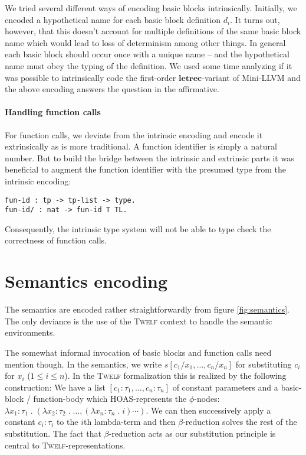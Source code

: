 \documentclass[a4paper, oneside, 10pt, draft]{memoir}
\newcommand{\twelf}{\textsc{Twelf}}
\begin{document}
We tried several different ways of encoding basic blocks
intrinsically. Initially, we encoded a hypothetical name for
each basic block definition $d_i$. It turns out, however, that this
doesn't account for multiple definitions of the same basic block
name which would lead to loss of determinism among other
things. In general each basic block should occur once with a unique
name -- and the hypothetical name must obey the typing of the
definition. We used some time analyzing if it was possible to
intrinsically code the first-order $\mathbf{letrec}$-variant of
Mini-LLVM and the above encoding answers the question in the
affirmative.

\paragraph{Handling function calls}

For function calls, we deviate from the intrinsic encoding and encode
it extrinsically as is more traditional. A function identifier is
simply a natural number. But to build the bridge between the intrinsic
and extrinsic parts it was beneficial to augment the function
identifier with the presumed type from the intrinsic encoding:
\begin{verbatim}
fun-id : tp -> tp-list -> type.
fun-id/ : nat -> fun-id T TL.
\end{verbatim}
Consequently, the intrinsic type system will not be able to type check
the correctness of function calls.

\section{Semantics encoding}

The semantics are encoded rather straightforwardly from figure
\ref{fig:semantics}. The only deviance is the use of the \twelf{}
context to handle the semantic environments.

The somewhat informal invocation of basic blocks and function calls
need mention though. In the semantics, we write $s[c_1/x_1, \dotsc,
c_n/x_n]$ for substituting $c_i$ for $x_i$ ($1 \leq i \leq n$). In the
\twelf{} formalization this is realized by the following construction:
We have a list $[c_1 : \tau_1, \dotsc, c_n : \tau_n]$ of constant
parameters and a basic-block / function-body which HOAS-represents the
$\phi$-nodes: $\lambda x_1 : \tau_1 \;.\; (\lambda x_2 : \tau_2 \;.\;
\dotsc, (\lambda x_n : \tau_n \;.\; i)\dotsb{})$. We can then
successively apply a constant $c_i : \tau_i$ to the $i$th lambda-term
and then $\beta$-reduction solves the rest of the substitution. The
fact that $\beta$-reduction acts as our substitution principle is
central to \twelf{}-representations.
\end{document}
